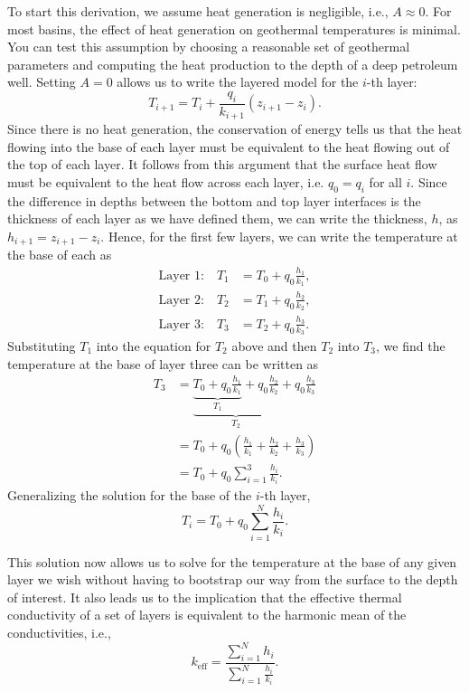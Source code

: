 To start this derivation, we assume heat generation is negligible, i.e., $A \approx 0$.  For most basins, the effect of heat generation on geothermal temperatures is minimal.  You can test this assumption by choosing a reasonable set of geothermal parameters and computing the heat production to the depth of a deep petroleum well.  Setting $A = 0$ allows us to write the layered model for the $i$-th layer:
\begin{equation}
  T_{i+1} = T_{i} + \frac{q_{i}}{k_{i+1}} (z_{i+1} - z_{i}).
\end{equation}
Since there is no heat generation, the conservation of energy tells us that the heat flowing into the base of each layer must be equivalent to the heat flowing out of the top of each layer.  It follows from this argument that the surface heat flow must be equivalent to the heat flow across each layer, i.e. $q_0 = q_i$ for all $i$.  Since the difference in depths between the bottom and top layer interfaces is the thickness of each layer as we have defined them, we can write the thickness, $h$, as $h_{i+1} = z_{i+1} - z_i$.  Hence, for the first few layers, we can write the temperature at the base of each as
\begin{align*}
    \text{Layer 1:} \quad T_1 &= T_0 + q_0 \frac{h_1}{k_1} , \\
    \text{Layer 2:} \quad T_2 &= T_1 + q_0 \frac{h_2}{k_2} ,  \\
    \text{Layer 3:} \quad T_3 &= T_2 + q_0 \frac{h_3}{k_3} .
\end{align*}
Substituting $T_1$ into the equation for $T_2$ above and then $T_2$ into $T_3$,
we find the temperature at the base of layer three can be written as
\begin{align*}
    T_3 &= \underbrace{
            \underbrace{T_0 + q_0 \frac{h_1}{k_1}}_{T_1}
            + q_0 \frac{h_2}{k_2}
        }_{T_2}
        + q_0 \frac{h_3}{k_3} \\
        &= T_0 + q_0 \left( \frac{h_1}{k_1} + \frac{h_2}{k_2} + \frac{h_3}{k_3}
        \right) \\
        &= T_0 + q_0 \sum_{i=1}^3 \frac{h_i}{k_i} .
\end{align*}
Generalizing the solution for the base of the $i$-th layer,
\begin{equation}
    T_{i} = T_{0} + q_{0} \sum_{i=1}^{N} \frac{h_i}{k_i} .
\end{equation}

This solution now allows us to solve for the temperature at the base of any given layer we wish without having to bootstrap our way from the surface to the depth of interest.  It also leads us to the implication that the effective thermal conductivity of a set of layers is equivalent to the harmonic mean of the conductivities, i.e.,
\begin{equation}
    k_{\mathrm{eff}} = \frac{\sum_{i=1}^N h_i}{\sum_{i=1}^N \frac{h_i}{k_i}} .
\end{equation}


